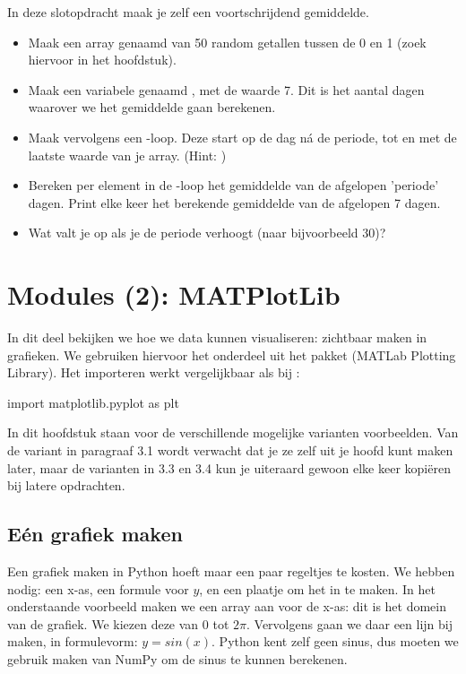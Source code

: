 \documentclass[a4paper,11pt, fleqn]{article}
\newcommand{\ditwc}{Naam van het huidige werkcollege}
\begin{document}
In deze slotopdracht maak je zelf een voortschrijdend gemiddelde.

\begin{itemize}
	\item Maak een array genaamd  van 50 random getallen tussen de 0 en 1 (zoek hiervoor in het hoofdstuk).
	\item Maak een variabele genaamd , met de waarde 7. Dit is het aantal dagen waarover we het gemiddelde gaan berekenen.
	\item Maak vervolgens een -loop. Deze start op de dag n\'a de periode, tot en met de laatste waarde van je array. (Hint: )
	\item Bereken per element in de -loop het gemiddelde van de afgelopen 'periode' dagen. Print elke keer het berekende gemiddelde van de afgelopen 7 dagen.
	\item Wat valt je op als je de periode verhoogt (naar bijvoorbeeld 30)?
\end{itemize}

\clearpage
\renewcommand{\ditwc}{Modules(2): MATPlotLib}
\section{Modules (2): MATPlotLib}
In dit deel bekijken we hoe we data kunnen visualiseren: zichtbaar maken in grafieken. We gebruiken hiervoor het  onderdeel uit het pakket  (MATLab Plotting Library). Het importeren werkt vergelijkbaar als bij :
\begin{python}
import matplotlib.pyplot as plt
\end{python}

In dit hoofdstuk staan voor de verschillende mogelijke varianten voorbeelden. Van de variant in paragraaf 3.1 wordt verwacht dat je ze zelf uit je hoofd kunt maken later, maar de varianten in 3.3 en 3.4 kun je uiteraard gewoon elke keer kopi\"eren bij latere opdrachten.

\subsection{E\'en grafiek maken}
Een grafiek maken in Python hoeft maar een paar regeltjes te kosten. We hebben nodig: een x-as, een formule voor $y$, en een plaatje om het in te maken. In het onderstaande voorbeeld maken we een array aan voor de x-as: dit is het domein van de grafiek. We kiezen deze van $0$ tot $2\pi$. Vervolgens gaan we daar een lijn bij maken, in formulevorm: $y = sin(x)$. Python kent zelf geen sinus, dus moeten we gebruik maken van NumPy om de sinus te kunnen berekenen.
\end{document}

